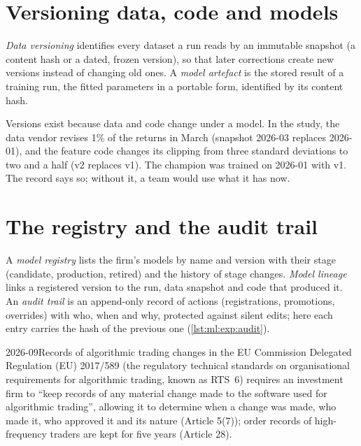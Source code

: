 \section{Versioning data, code and models}

\begin{definition}\label{def:ml:experiment-tracking-and-reproducibility:versions}
\emph{Data versioning} identifies every dataset a run reads by an immutable snapshot (a content hash or a
dated, frozen version), so that later corrections create new versions instead of changing old ones. A \emph{model
artefact} is the stored result of a training run, the fitted parameters in a portable form, identified by
its content hash.
\end{definition}

Versions exist because data and code change under a model. In the study, the data vendor revises 1\% of the returns in March
(snapshot 2026-03 replaces 2026-01), and the feature code changes its clipping from three standard deviations to two and a half
(v2 replaces v1). The champion was trained on 2026-01 with v1. The record says so; without it, a team would use what it has now.

\section{The registry and the audit trail}

\begin{definition}\label{def:ml:experiment-tracking-and-reproducibility:registry}
A \emph{model registry} lists the firm's models by name and version with their stage (candidate,
production, retired) and the history of stage changes. \emph{Model lineage} links a registered version to
the run, data snapshot and code that produced it. An \emph{audit trail} is an append-only record of actions
(registrations, promotions, overrides) with who, when and why, protected against silent edits; here each entry carries the hash
of the previous one (\cref{lst:ml:exp:audit}).
\end{definition}

\begin{dated}{2026-09}{Records of algorithmic trading changes in the EU}\label{dat:ml:experiment-tracking-and-reproducibility:rts6}
Commission Delegated Regulation (EU) 2017/589 (the regulatory technical standards on organisational requirements for
algorithmic trading, known as RTS~6) requires an investment firm to ``keep records of any material change made to the software
used for algorithmic trading'', allowing it to determine when a change was made, who made it, who approved it and its nature
(Article 5(7)); order records of high-frequency traders are kept for five years (Article 28).
\end{dated}


